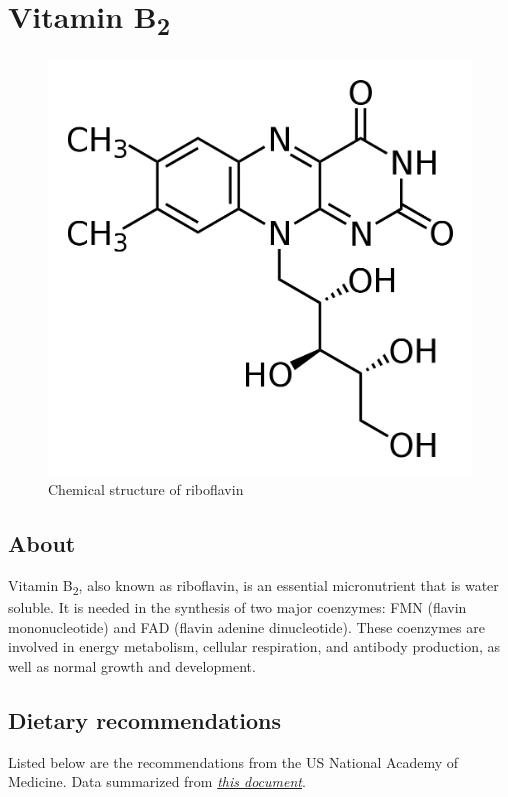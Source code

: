 \documentclass{book}
\begin{document}
\begin{sloppypar}
\chapter{Vitamin B\texorpdfstring{\textsubscript{2}}{2}}
\begin{figure}[h]
	\caption{Chemical structure of riboflavin}
	\centering \includegraphics[width=\textwidth]{images/Vitamin_B2_chemical_structure}
\end{figure}
\newpage

\section{About}
Vitamin B\textsubscript{2}, also known as riboflavin, is an essential micronutrient that is water soluble.
It is needed in the synthesis of two major coenzymes: FMN (flavin mononucleotide) and FAD (flavin adenine dinucleotide).
These coenzymes are involved in energy metabolism, cellular respiration, and antibody production, as well as normal growth and development.

\section{Dietary recommendations}
Listed below are the recommendations from the US National Academy of Medicine. Data summarized from \href{https://nap.nationalacademies.org/read/6015/chapter/7}{\textit{this document}}.


\end{sloppypar}
\end{document}
